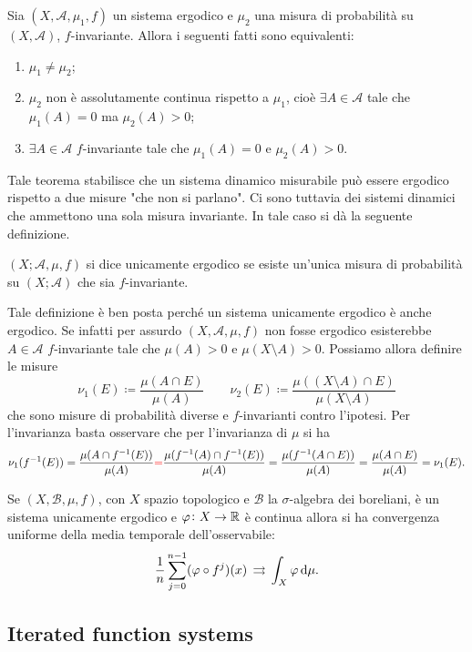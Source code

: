 \begin{proposition}
    Sia $ (X, \mathcal{A}, \mu_1, f) $ un sistema ergodico e $ \mu_2 $ una misura di probabilità su $ (X, \mathcal{A}) $, $ f $-invariante. Allora i seguenti fatti sono equivalenti:
    \begin{enumerate}[label=(\roman*)]
        \item $ \mu_1 \neq \mu_2 $;
        \item $ \mu_2 $ non è assolutamente continua rispetto a $ \mu_1 $, cioè $ \exists A \in \mathcal{A} $ tale che $ \mu_1(A) = 0 $ ma $ \mu_2(A) > 0 $;
        \item $ \exists A \in \mathcal{A} $ $ f $-invariante tale che $ \mu_1(A) = 0 $ e $ \mu_2(A) > 0 $.
    \end{enumerate}
\end{proposition}

Tale teorema stabilisce che un sistema dinamico misurabile può essere ergodico rispetto a due misure "che non si parlano". Ci sono tuttavia dei sistemi dinamici che ammettono una sola misura invariante. In tale caso si dà la seguente definizione.

\begin{definition}
    $ (X; \mathcal{A}, \mu, f) $ si dice unicamente ergodico se esiste un'unica misura di probabilità su $ (X; \mathcal{A}) $ che sia $ f $-invariante.
\end{definition}

Tale definizione è ben posta perché un sistema unicamente ergodico è anche ergodico. Se infatti per assurdo $ (X, \mathcal{A}, \mu, f) $ non fosse ergodico esisterebbe $ A \in \mathcal{A} $ $ f $-invariante tale che $ \mu(A) > 0 $ e $ \mu(X \setminus A) > 0 $. Possiamo allora definire le misure 
\[
     \nu_1(E) \coloneqq \frac{\mu(A \cap E)}{\mu(A)} 
     \qquad 
     \nu_2(E) \coloneqq \frac{\mu((X \setminus A) \cap E)}{\mu(X \setminus A)}
\] 
che sono misure di probabilità diverse e $ f $-invarianti contro l'ipotesi. Per l'invarianza basta osservare che per l'invarianza di $ \mu $ si ha
\[
    \nu_1(f^{-1}(E)) = \frac{\mu(A \cap f^{-1}(E))}{\mu(A)} \textcolor{red}{=} \frac{\mu(f^{-1}(A) \cap f^{-1}(E))}{\mu(A)} = \frac{\mu(f^{-1}(A \cap E))}{\mu(A)} = \frac{\mu(A \cap E)}{\mu(A)} = \nu_1(E).
\] 

\begin{thm}
    Se $ (X, \mathcal{B}, \mu, f) $, con $ X $ spazio topologico e $ \mathcal{B} $ la $ \sigma $-algebra dei boreliani, è un sistema unicamente ergodico e $ \varphi \colon X \to \mathbb{R} $ è continua allora si ha convergenza uniforme della media temporale dell'osservabile:
    \[
        \frac{1}{n} \sum_{j=0}^{n-1} (\varphi \circ f^j)(x) \, \touf \, \int_X \varphi \dif{\mu}.
    \]
\end{thm}

\subsection{Iterated function systems}